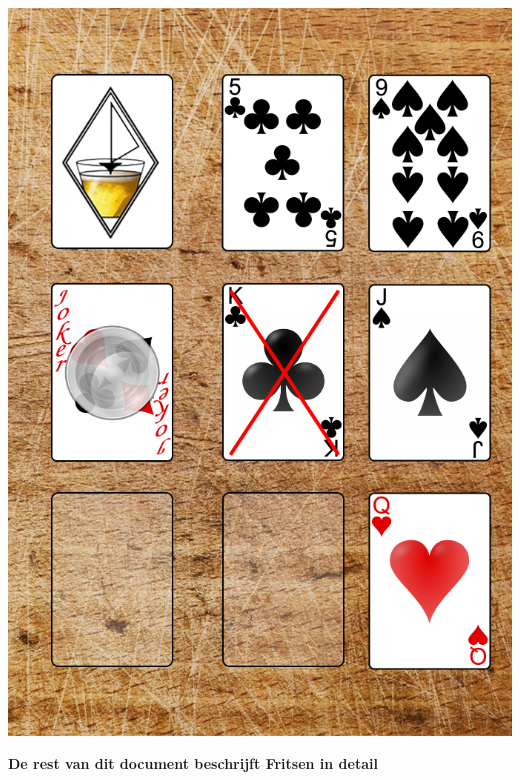 \begin{minipage}[t]{.48\textwidth}
%
{\includegraphics[width=1\textwidth]{img/FritsPlank._Caroline2.png}}
\end{minipage}

\vspace{0.53cm}

\centerline{\Large{\textbf{De rest van dit document beschrijft Fritsen in detail}}}